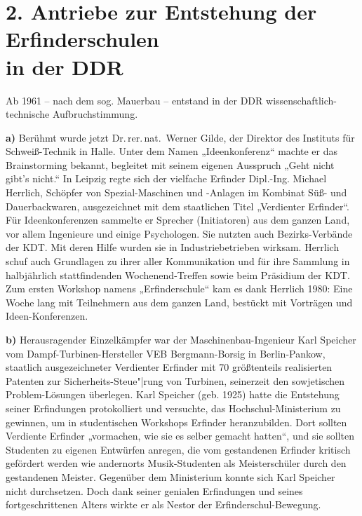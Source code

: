 \documentclass[12pt,a4paper]{article}
\begin{document}
\section*{2. Antriebe zur Entstehung der Erfinderschulen\\ in der DDR}

Ab 1961 -- nach dem sog. Mauerbau -- entstand in der DDR
wissenschaftlich-technische Aufbruchstimmung.

\textbf{a)} 
Berühmt wurde jetzt Dr.\,rer.\,nat.~Werner Gilde, der Direktor des Instituts
für Schweiß-Technik in Halle. Unter dem Namen „Ideenkonferenz“ machte er das
Brainstorming bekannt, begleitet mit seinem eigenen Ausspruch „Geht nicht
gibt's nicht.“ In Leipzig regte sich der vielfache Erfinder Dipl.-Ing. Michael
Herrlich, Schöpfer von Spezial-Maschinen und -Anlagen im Kombinat Süß- und
Dauerbackwaren, ausgezeichnet mit dem staatlichen Titel „Verdienter Erfinder“.
Für Ideenkonferenzen sammelte er Sprecher (Initiatoren) aus dem ganzen Land,
vor allem Ingenieure und einige Psychologen. Sie nutzten auch Bezirks-Verbände
der KDT. Mit deren Hilfe wurden sie in Industriebetrieben wirksam. Herrlich
schuf auch Grundlagen zu ihrer aller Kommunikation und für ihre Sammlung in
halbjährlich stattfindenden Wochenend-Treffen sowie beim Präsidium der KDT. Zum
ersten Workshop namens „Erfinderschule“ kam es dank Herrlich 1980: Eine Woche
lang mit Teilnehmern aus dem ganzen Land, bestückt mit Vorträgen und
Ideen-Konferenzen.

\textbf{b)} 
Herausragender Einzelkämpfer war der Maschinenbau-Ingenieur Karl Speicher vom
Dampf-Turbinen-Hersteller VEB Bergmann-Borsig in Berlin-Pankow, staatlich
ausgezeichneter Verdienter Erfinder mit 70 größtenteils realisierten Patenten
zur Sicherheits-Steue"|rung von Turbinen, seinerzeit den sowjetischen
Problem-Lösungen überlegen. Karl Speicher (geb. 1925) hatte die Entstehung
seiner Erfindungen protokolliert und versuchte, das Hochschul-Ministerium zu
gewinnen, um in studentischen Workshops Erfinder heranzubilden. Dort sollten
Verdiente Erfinder „vormachen, wie sie es selber gemacht hatten“, und sie
sollten Studenten zu eigenen Entwürfen anregen, die vom gestandenen Erfinder
kritisch gefördert werden wie andernorts Musik-Studenten als Meisterschüler
durch den gestandenen Meister. Gegenüber dem Ministerium konnte sich Karl
Speicher nicht durchsetzen. Doch dank seiner genialen Erfindungen und seines
fortgeschrittenen Alters wirkte er als Nestor der Erfinderschul-Bewegung.
\end{document}
